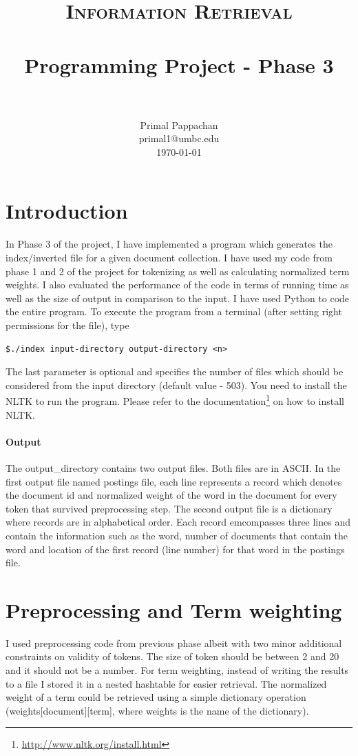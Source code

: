 \documentclass[paper=a4, fontsize=11pt]{scrartcl}
\title{
		\usefont{OT1}{bch}{b}{n}
		\normalfont \normalsize \textsc{Information Retrieval} \\ [25pt]
		\horrule{0.5pt} \\[0.4cm]
		\huge Programming Project - Phase 3 \\
		\horrule{2pt} \\[0.5cm]
}
\author{
		\normalfont 								\normalsize
        Primal Pappachan\\[-3pt]		\normalsize
        primal1@umbc.edu\\[-3pt]		\normalsize
        \today
}
\date{}
\numberwithin{equation}{section}		%
\numberwithin{figure}{section}			%
\numberwithin{table}{section}				%
\begin{document}
\maketitle
\section{Introduction}
In Phase 3 of the project, I have implemented a program which generates the index/inverted file for a given document collection. I have used my code from phase 1 and 2 of the project for tokenizing as well as calculating normalized term weights.  I also evaluated the performance of the code in terms of running time as well as the size of output in comparison to the input. I have used Python to code the entire program. To execute the program from a terminal (after setting right permissions for the file), type 

\begin{verbatim}
$./index input-directory output-directory <n>
\end{verbatim}

The last parameter is optional and specifies the number of files which should be considered from the input directory (default value - 503). You need to install the NLTK to run the program. Please refer to the documentation\footnote{\url{http://www.nltk.org/install.html}} on how to install NLTK.

\paragraph{Output}

The output\_directory contains two output files. Both files are in ASCII. In the first output file named postings file, each line represents a record which denotes the document id and normalized weight of the word in the document for every token that survived preprocessing step. The second output file is a dictionary where records are in alphabetical order. Each record emcompasses three lines and contain the information such as the word, number of documents that contain the word and location of the first record (line number) for that word in the postings file.

\section{Preprocessing and Term weighting}

I used preprocessing code from previous phase albeit with two minor additional constraints on validity of tokens. The size of token should be between 2 and 20 and it should not be a number. For term weighting, instead of writing the results to a file I stored it in a nested hashtable for easier retrieval. The normalized weight of a term could be retrieved using a simple dictionary operation (weights[document][term], where weights is the name of the dictionary).
\end{document}
